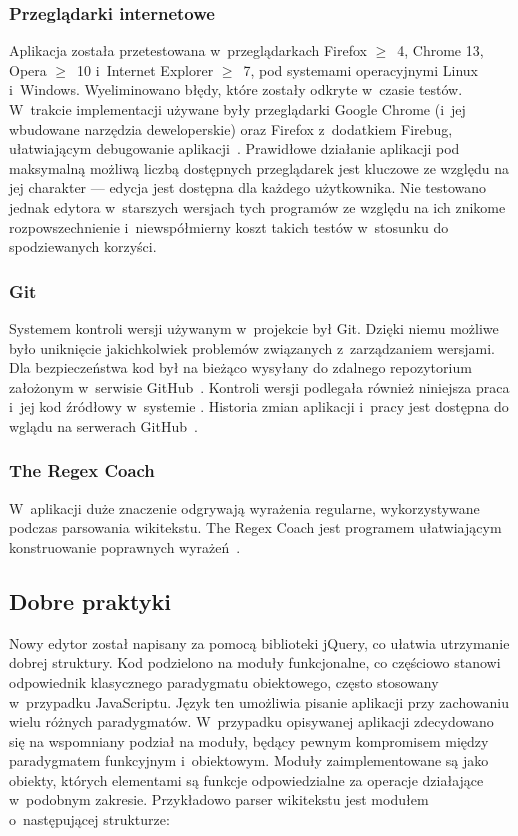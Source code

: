 \subsubsection{Przeglądarki internetowe}
Aplikacja została przetestowana w~przeglądarkach Firefox $\geq$~4, Chrome 13, Opera $\geq$~10 i~Internet Explorer $\geq$~7, pod systemami operacyjnymi Linux i~Windows. Wyeliminowano błędy, które zostały odkryte w~czasie testów. W~trakcie implementacji używane były przeglądarki Google Chrome (i~jej wbudowane narzędzia deweloperskie) oraz Firefox z~dodatkiem Firebug, ułatwiającym debugowanie aplikacji~\cite{firebug}. Prawidłowe działanie aplikacji pod maksymalną możliwą liczbą dostępnych przeglądarek jest kluczowe ze względu na jej charakter --- edycja jest dostępna dla każdego użytkownika. Nie testowano jednak edytora w~starszych wersjach tych programów ze względu na ich znikome rozpowszechnienie i~niewspółmierny koszt takich testów w~stosunku do spodziewanych korzyści.
\subsubsection{Git}
Systemem kontroli wersji używanym w~projekcie był Git. Dzięki niemu możliwe było uniknięcie jakichkolwiek problemów związanych z~zarządzaniem wersjami. Dla bezpieczeństwa kod był na bieżąco wysyłany do zdalnego repozytorium założonym w~serwisie GitHub~\cite{github}. Kontroli wersji podlegała również niniejsza praca i~jej kod źródłowy w~systemie \XeTeX. Historia zmian aplikacji i~pracy jest dostępna do wglądu na serwerach GitHub~\cite{github:wikt}.
\subsubsection{The Regex Coach}
W~aplikacji duże znaczenie odgrywają wyrażenia regularne, wykorzystywane podczas parsowania wikitekstu. The Regex Coach jest programem ułatwiającym konstruowanie poprawnych wyrażeń~\cite{regexcoach}.
\spacer

\subsection{Dobre praktyki}
Nowy edytor został napisany za pomocą biblioteki jQuery, co ułatwia utrzymanie dobrej struktury. Kod podzielono na moduły funkcjonalne, co częściowo stanowi odpowiednik klasycznego paradygmatu obiektowego, często stosowany w~przypadku JavaScriptu. Język ten umożliwia pisanie aplikacji przy zachowaniu wielu różnych paradygmatów. W~przypadku opisywanej aplikacji zdecydowano się na wspomniany podział na moduły, będący pewnym kompromisem między paradygmatem funkcyjnym i~obiektowym. Moduły zaimplementowane są jako obiekty, których elementami są funkcje odpowiedzialne za operacje działające w~podobnym zakresie. Przykładowo parser wikitekstu jest modułem o~następującej strukturze:

